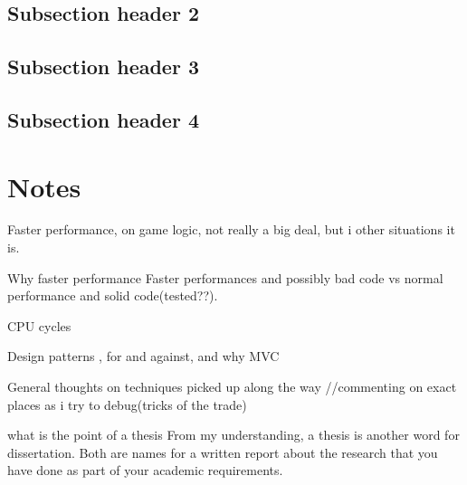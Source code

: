 \subsection{Subsection header 2}




\subsection{Subsection header 3}




\subsection{Subsection header 4}














































\section{Notes}

Faster performance, on game logic, not really a big deal,
but i other situations it is.

Why faster performance
Faster performances and possibly bad code vs normal performance and solid code(tested??).

CPU cycles

Design patterns , for and against, and why MVC

General thoughts on techniques picked up along the way
//commenting on exact places as i try to debug(tricks of the trade)

what is the point of a thesis
From my understanding, a thesis is another word for dissertation.  Both are names for a written report about the research that you have done as part of your academic requirements.

